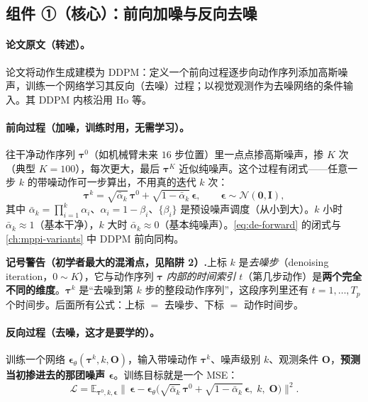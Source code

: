\subsection{组件 ①（核心）：前向加噪与反向去噪}
\label{sec:de-ddpm}

\paragraph{论文原文（转述）。}
论文将动作生成建模为 DDPM：定义一个前向过程逐步向动作序列添加高斯噪声，训练一个网络学习其反向（去噪）过程；以视觉观测作为去噪网络的条件输入\cite{chi2023diffusion}。其 DDPM 内核沿用 Ho 等\cite{ho2020ddpm}。

\paragraph{前向过程（加噪，训练时用，无需学习）。}
往干净动作序列 $\boldsymbol{\tau}^0$（如机械臂未来 $16$ 步位置）里一点点掺高斯噪声，掺 $K$ 次（典型 $K=100$），每次更大，最后 $\boldsymbol{\tau}^K$ 近似纯噪声。这个过程有闭式——任意一步 $k$ 的带噪动作可一步算出，不用真的迭代 $k$ 次：
\begin{equation}
  \boldsymbol{\tau}^k=\sqrt{\bar\alpha_k}\,\boldsymbol{\tau}^0+\sqrt{1-\bar\alpha_k}\,\boldsymbol{\epsilon},\qquad \boldsymbol{\epsilon}\sim\mathcal{N}(\mathbf{0},\mathbf{I}),
  \label{eq:de-forward}
\end{equation}
其中 $\bar\alpha_k=\prod_{i=1}^{k}\alpha_i$、$\alpha_i=1-\beta_i$、$\{\beta_i\}$ 是预设噪声调度（从小到大）。$k$ 小时 $\bar\alpha_k\approx1$（基本干净），$k$ 大时 $\bar\alpha_k\approx0$（基本纯噪声）。\cref{eq:de-forward} 的闭式与 \cref{ch:mppi-variants} 中 DDPM 前向同构。

\begin{note}
\textbf{记号警告（初学者最大的混淆点，见陷阱 2）.}\;上标 $k$ 是\emph{去噪步}（denoising iteration，$0\sim K$），它与动作序列 $\boldsymbol{\tau}$ \emph{内部的时间索引} $t$（第几步动作）是\textbf{两个完全不同的维度}。$\boldsymbol{\tau}^k$ 是“去噪到第 $k$ 步的整段动作序列”，这段序列里还有 $t=1,\dots,T_p$ 个时间步。后面所有公式：上标 $=$ 去噪步、下标 $=$ 动作时间步。
\end{note}

\paragraph{反向过程（去噪，这才是要学的）。}
训练一个网络 $\boldsymbol{\epsilon}_\theta(\boldsymbol{\tau}^k,k,\mathbf{O})$，输入带噪动作 $\boldsymbol{\tau}^k$、噪声级别 $k$、观测条件 $\mathbf{O}$，\textbf{预测当初掺进去的那团噪声 $\boldsymbol{\epsilon}$}。训练目标就是一个 MSE：
\begin{equation}
  \mathcal{L}=\mathbb{E}_{\boldsymbol{\tau}^0,k,\boldsymbol{\epsilon}}\big\|\,\boldsymbol{\epsilon}-\boldsymbol{\epsilon}_\theta\big(\sqrt{\bar\alpha_k}\,\boldsymbol{\tau}^0+\sqrt{1-\bar\alpha_k}\,\boldsymbol{\epsilon},\;k,\;\mathbf{O}\big)\big\|^2.
  \label{eq:de-loss}
\end{equation}

